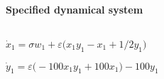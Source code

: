 
\begin{math}
\end{math}
\paragraph{Specified dynamical system}
\begin{math}
\end{math}\par

\begin{math}
\dot x_{1}=\sigma  w_{1}+\varepsilon  \big(x_{1} y_{1}-x_{1}+1/2 y_{1}
\big)
\end{math}\par

\begin{math}
\dot y_{1}=\varepsilon  \big(-100 x_{1} y_{1}+100 x_{1}\big)-100 y_{1}
\end{math}\par
